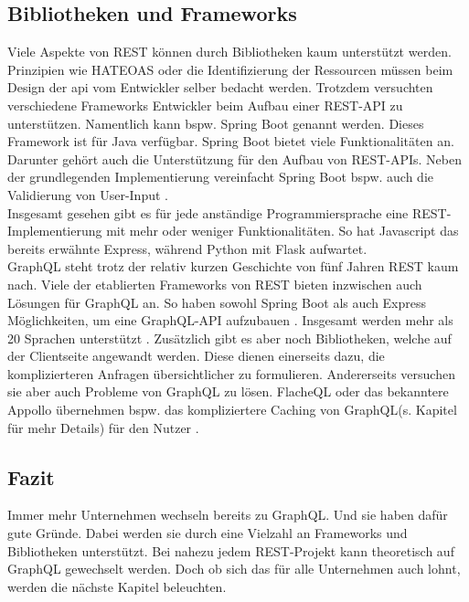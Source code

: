 \subsection{Bibliotheken und Frameworks}

Viele Aspekte von \ac{REST} können durch Bibliotheken kaum unterstützt werden. Prinzipien wie \ac{HATEOAS} oder die Identifizierung der Ressourcen müssen beim Design der \ac{api} vom Entwickler selber bedacht werden.  Trotzdem versuchten verschiedene Frameworks Entwickler beim Aufbau einer REST-API zu unterstützen. Namentlich kann bspw. Spring Boot genannt werden. Dieses Framework ist für Java verfügbar. Spring Boot bietet viele Funktionalitäten an. Darunter gehört auch die Unterstützung für den Aufbau von REST-APIs. Neben der grundlegenden Implementierung vereinfacht Spring Boot bspw. auch die Validierung von User-Input \parencite{Spring2020}.\\
Insgesamt gesehen gibt es für jede anständige Programmiersprache eine REST-Imple\-mentierung mit mehr oder weniger Funktionalitäten. So hat Javascript das bereits erwähnte Express, während Python mit Flask aufwartet. \parencite{Slant2020}\\
GraphQL steht trotz der relativ kurzen Geschichte von fünf Jahren \ac{REST} kaum nach. Viele der etablierten Frameworks von \ac{REST} bieten inzwischen auch Lösungen für GraphQL an. So haben sowohl Spring Boot als auch Express Möglichkeiten, um eine GraphQL-API aufzubauen \parencite{Spring2020GraphQL} \parencite{GraphQL2020}. Insgesamt werden mehr als 20 Sprachen unterstützt \parencite{GraphQL2020Code}. Zusätzlich gibt es aber noch Bibliotheken, welche auf der Clientseite angewandt werden. Diese dienen einerseits dazu, die komplizierteren Anfragen übersichtlicher zu formulieren. Andererseits versuchen sie aber auch Probleme von GraphQL zu lösen. FlacheQL oder das bekanntere Appollo übernehmen bspw. das kompliziertere Caching von GraphQL(s. Kapitel  für mehr Details) für den Nutzer \parencite{FlacheQL2019} \parencite{Apollo2020}. 

\subsection{Fazit}

Immer mehr Unternehmen wechseln bereits zu GraphQL. Und sie haben dafür gute Gründe. Dabei werden sie durch eine Vielzahl an Frameworks und Bibliotheken unterstützt. Bei nahezu jedem REST-Projekt kann theoretisch auf GraphQL gewechselt werden. Doch ob sich das für alle Unternehmen auch lohnt, werden die nächste Kapitel beleuchten.

